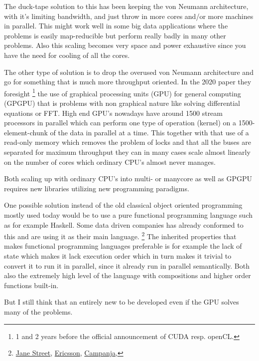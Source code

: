 \documentclass{article}
\begin{document}
    The duck-tape solution to this has been keeping the von Neumann
    architecture, with it's limiting bandwidth, and just throw in more cores and/or more machines in parallel.
    This might work well in some big data applications where the problems is easily
    map-reducible but perform really badly in many other
    problems.\cite{mapreduce} Also
    this scaling becomes very space and power exhaustive since you have the need for
    cooling of all the cores. 

    The other type of solution is to drop the overused von Neumann architecture
    and go for something that is much more throughput oriented. In the 2020
    paper\cite{ms2020} they foresight
    \footnote{1 and 2 years before the official 
    announcement of CUDA resp. openCL.} 
    the use of graphical processing units
    (GPU) for general computing (GPGPU) that is problems with non graphical nature like
    solving differential equations or FFT. High end GPU's nowadays have around
    1500 stream processors in parallel which can perform one type of operation
    (kernel)
    on a 1500-element-chunk of the data in parallel at a time. This together
    with that use 
    of a read-only memory which removes the problem of locks
    and that all the buses are separated for
    maximum throughput they can in many cases  scale almost linearly 
    on the number of cores
    which ordinary CPU's almost never manages.

    Both scaling up with ordinary CPU's into multi- or manycore as well as
    GPGPU requires new libraries utilizing new programming paradigms.

    One possible solution instead of the old classical object oriented
    programming mostly used today would be to use a pure functional programming
    language such as
    for example Haskell. Some data driven companies has
    already conformed to this and are using it as their main language.
    \footnote{
        \href{http://www.janestreet.com}{Jane Street},
        \href{http://www.ericsson.com}{Ericsson},
        \href{http://www.campanja.com}{Campanja},
    }
    The inherited properties that makes functional programming languages 
    preferable is for example the lack of state 
    which makes it lack execution order which in turn makes it
    trivial to convert it to run it in parallel, since it already run in parallel
    semantically. Both also the extremely high level of the language with
    compositions and higher order functions built-in.\cite{haskell}

    But I still think that an entirely new to be developed even if the GPU
    solves many of the problems.
    
\end{document}
